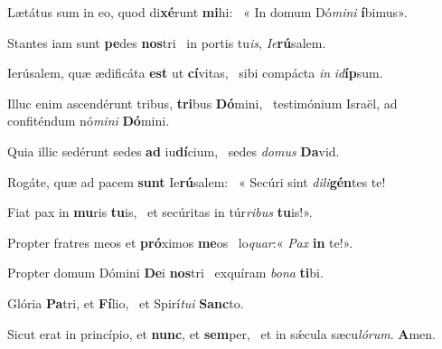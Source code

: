 \item Lætátus sum in eo, quod di\textbf{xé}runt \textbf{mi}hi:~\psstar{} « In domum Dó\textit{mini} \textbf{í}bimus».

\item Stantes iam sunt \textbf{pe}des \textbf{nos}tri~\psstar{} in portis tu\textit{is}, \textit{Ie}\textbf{rú}salem.

\item Ierúsalem, quæ ædificáta \textbf{est} ut \textbf{cí}vitas,~\psstar{} sibi compácta \textit{in} \textit{id}\textbf{íp}sum.

\item Illuc enim ascendérunt tribus, \textbf{tri}bus \textbf{Dó}mini,~\psstar{} testimónium Israël, ad confiténdum nó\textit{mini} \textbf{Dó}mini.

\item Quia illic sedérunt sedes \textbf{ad} iu\textbf{dí}cium,~\psstar{} sedes \textit{domus} \textbf{Da}vid.

\item Rogáte, quæ ad pacem \textbf{sunt} Ie\textbf{rú}salem:~\psstar{} « Secúri sint \textit{dili}\textbf{gén}tes te!

\item Fiat pax in \textbf{mu}ris \textbf{tu}is,~\psstar{} et secúritas in túr\textit{ribus} \textbf{tu}is!».

\item Propter fratres meos et \textbf{pró}ximos \textbf{me}os~\psstar{} lo\textit{quar}:« \textit{Pax} \textbf{in} te!».

\item Propter domum Dómini \textbf{De}i \textbf{nos}tri~\psstar{} exquíram \textit{bona} \textbf{ti}bi.

\item Glória \textbf{Pa}tri, et \textbf{Fí}lio,~\psstar{} et Spirí\textit{tui} \textbf{Sanc}to.

\item Sicut erat in princípio, et \textbf{nunc}, et \textbf{sem}per,~\psstar{} et in sǽcula sæcu\textit{lórum}. \textbf{A}men.